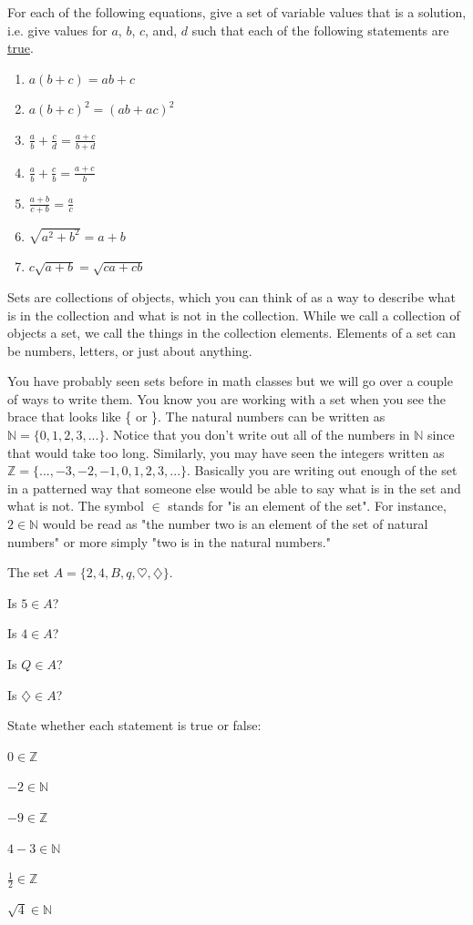 \bq For each of the following equations, give a set of variable values that is a solution, i.e. give values for $a$, $b$, $c$, and, $d$ such that each of the following statements are \underline{true}.
\begin{enumerate}
\item $a(b+c)=ab+c$
\item $a(b+c)^2 =(ab+ac)^2$
\item $\frac{a}{b}+\frac{c}{d} =\frac{a+c}{b+d}$
\item $\frac{a}{b}+\frac{c}{b} =\frac{a+c}{b}$
\item $\frac{a+b}{c+b}=\frac{a}{c}$
\item $\sqrt{a^2+b^2}=a+b$
\item $c \sqrt{a+b}=\sqrt{ca+cb}$
\end{enumerate}
\eq



\begin{info}
Sets are collections of objects, which you can think of as a way to describe what is in the collection and what is not in the collection. While we call a collection of objects a set, we call the things in the collection elements. Elements of a set can be numbers, letters, or just about anything.

You have probably seen sets before in math classes but we will go over a couple of ways to write them. You know you are working with a set when you see the brace that looks like \{ or \}. The natural numbers can be written as $\mathbb{N} = \{0,1,2,3,... \}$. Notice that you don't write out all of the numbers in $\mathbb{N}$ since that would take too long. Similarly, you may have seen the integers written as $\mathbb{Z}=\{ ...,-3,-2,-1,0,1,2,3,... \}$. Basically you are writing out enough of the set in a patterned way that someone else would be able to say what is in the set and what is not. The symbol $\in$ stands for "is an element of the set". For instance, $ 2 \in \mathbb{N}$ would be read as "the number two is an element of the set of natural numbers" or more simply "two is in the natural numbers."
\end{info}
\bq The set $A=\{2,4,B,q,\heartsuit,\diamondsuit \}$.
\be
\item Is $5 \in A$?
\item Is $4 \in A$?
\item Is $Q \in A$?
\item Is $\diamondsuit \in A$?
\ee
\eq


\bq State whether each statement is true or false:
\be
\item $0 \in \mathbb{Z}$
\item $-2 \in \mathbb{N}$
\item $-9 \in \mathbb{Z}$
\item $4-3 \in \mathbb{N}$
\item $\frac{1}{2} \in \mathbb{Z}$
\item $\sqrt{4} \in \mathbb{N}$
\ee \eq

